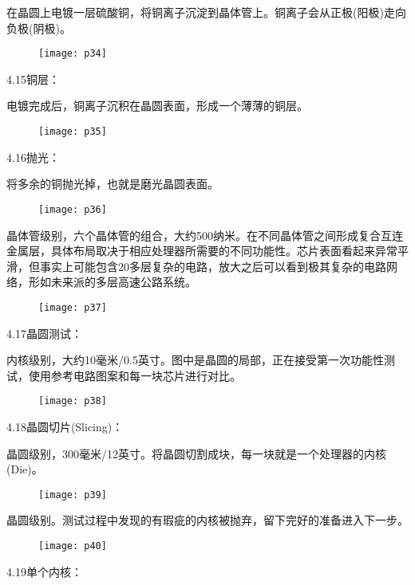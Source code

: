 \documentclass[utf8]{book}
\begin{document}
	在晶圆上电镀一层硫酸铜，将铜离子沉淀到晶体管上。铜离子会从正极(阳极)走向负极(阴极)。
	\begin{figure}[H]
		\centering
		\texttt{[image: p34]}
	\end{figure}
	
	4.15铜层：
	
	电镀完成后，铜离子沉积在晶圆表面，形成一个薄薄的铜层。
	\begin{figure}[H]
		\centering
		\texttt{[image: p35]}
	\end{figure}
	4.16抛光：
	
	将多余的铜抛光掉，也就是磨光晶圆表面。
	\begin{figure}[H]
		\centering
		\texttt{[image: p36]}
	\end{figure}
	晶体管级别，六个晶体管的组合，大约500纳米。在不同晶体管之间形成复合互连金属层，具体布局取决于相应处理器所需要的不同功能性。芯片表面看起来异常平滑，但事实上可能包含20多层复杂的电路，放大之后可以看到极其复杂的电路网络，形如未来派的多层高速公路系统。

	
	\begin{figure}[H]
		\centering
		\texttt{[image: p37]}
	\end{figure}
	4.17晶圆测试：
	
	内核级别，大约10毫米/0.5英寸。图中是晶圆的局部，正在接受第一次功能性测试，使用参考电路图案和每一块芯片进行对比。
	\begin{figure}[H]
		\centering
		\texttt{[image: p38]}
	\end{figure}
	4.18晶圆切片(Slicing)：
	
	晶圆级别，300毫米/12英寸。将晶圆切割成块，每一块就是一个处理器的内核(Die)。
	\begin{figure}[H]
		\centering
		\texttt{[image: p39]}
	\end{figure}
	晶圆级别。测试过程中发现的有瑕疵的内核被抛弃，留下完好的准备进入下一步。
	
	\begin{figure}[H]
	\centering
	\texttt{[image: p40]}
	\end{figure}
	4.19单个内核：
	
\end{document}
